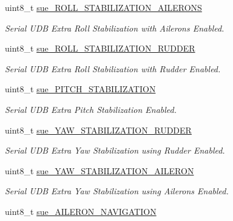 \begin{DoxyCompactItemize}
\item 
uint8\+\_\+t \hyperlink{struct____mavlink__serial__udb__extra__f4__t_aa3ae98254f8107a814b0cc016c227b2a}{sue\+\_\+\+R\+O\+L\+L\+\_\+\+S\+T\+A\+B\+I\+L\+I\+Z\+A\+T\+I\+O\+N\+\_\+\+A\+I\+L\+E\+R\+O\+N\+S}
\begin{DoxyCompactList}\small\item\em Serial U\+D\+B Extra Roll Stabilization with Ailerons Enabled. \end{DoxyCompactList}\item 
uint8\+\_\+t \hyperlink{struct____mavlink__serial__udb__extra__f4__t_ad4c88a9b10c89a3bc7b36a5138945822}{sue\+\_\+\+R\+O\+L\+L\+\_\+\+S\+T\+A\+B\+I\+L\+I\+Z\+A\+T\+I\+O\+N\+\_\+\+R\+U\+D\+D\+E\+R}
\begin{DoxyCompactList}\small\item\em Serial U\+D\+B Extra Roll Stabilization with Rudder Enabled. \end{DoxyCompactList}\item 
uint8\+\_\+t \hyperlink{struct____mavlink__serial__udb__extra__f4__t_a88b65cdd6313a90c665e2de1cc01631a}{sue\+\_\+\+P\+I\+T\+C\+H\+\_\+\+S\+T\+A\+B\+I\+L\+I\+Z\+A\+T\+I\+O\+N}
\begin{DoxyCompactList}\small\item\em Serial U\+D\+B Extra Pitch Stabilization Enabled. \end{DoxyCompactList}\item 
uint8\+\_\+t \hyperlink{struct____mavlink__serial__udb__extra__f4__t_a12f2d92b28b3286e2ee88e6b7cd30c85}{sue\+\_\+\+Y\+A\+W\+\_\+\+S\+T\+A\+B\+I\+L\+I\+Z\+A\+T\+I\+O\+N\+\_\+\+R\+U\+D\+D\+E\+R}
\begin{DoxyCompactList}\small\item\em Serial U\+D\+B Extra Yaw Stabilization using Rudder Enabled. \end{DoxyCompactList}\item 
uint8\+\_\+t \hyperlink{struct____mavlink__serial__udb__extra__f4__t_a9033c3249962079cc27b098cf3eaf706}{sue\+\_\+\+Y\+A\+W\+\_\+\+S\+T\+A\+B\+I\+L\+I\+Z\+A\+T\+I\+O\+N\+\_\+\+A\+I\+L\+E\+R\+O\+N}
\begin{DoxyCompactList}\small\item\em Serial U\+D\+B Extra Yaw Stabilization using Ailerons Enabled. \end{DoxyCompactList}\item 
uint8\+\_\+t \hyperlink{struct____mavlink__serial__udb__extra__f4__t_a93267d264ca874f7c302febb409c3931}{sue\+\_\+\+A\+I\+L\+E\+R\+O\+N\+\_\+\+N\+A\+V\+I\+G\+A\+T\+I\+O\+N}

\end{DoxyCompactItemize}
